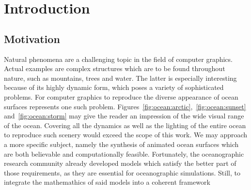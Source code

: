 \chapter{Introduction}
\label{ch:intro}
%
\section{Motivation}
\label{sec:motivation}
Natural phenomena are a challenging topic in the field of computer graphics.
Actual examples are complex structures which are to be found throughout nature,
such as mountains, trees and water. The latter is especially interesting
because of its highly dynamic form, which poses a variety of sophisticated problems.
For computer graphics to reproduce the diverse appearance of ocean surfaces
represents one such problem.
Figures~\ref{fig:ocean:arctic},~\ref{fig:ocean:sunset} and~\ref{fig:ocean:storm}
may give the reader an impression of the wide visual range of the ocean.
Covering all the dynamics as well as the lighting of the entire ocean to
reproduce such scenery would exceed the scope of this work.
We may approach a more specific subject, namely the synthesis of animated ocean
surfaces which are both believable and computationally feasible.
Fortunately, the oceanographic research community already developed models
which satisfy the better part of those requirements, as they are essential for
oceanographic simulations.
Still, to integrate the mathemathics of said models into a coherent framework
